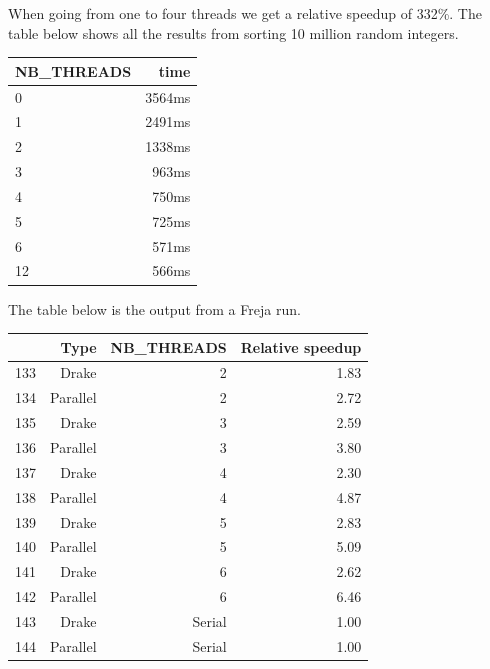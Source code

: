 \documentclass[a4paper,12pt]{article}
\begin{document}
\begin{minipage}{\textwidth}

  When going from one to four threads we get a relative speedup of 332\%. The table below shows all the results from sorting 10 million random integers.

  \begin{tabular}{ |l|r| }
	\hline
	NB\_THREADS & time \\
	\hline
    0 & 3564ms \\
    1 & 2491ms \\
    2 & 1338ms \\
    3 & 963ms \\
    4 & 750ms \\
    5 & 725ms \\
    6 & 571ms \\
    12 & 566ms \\
	\hline
  \end{tabular}

  \vspace{10mm}
  
  The table below is the output from a Freja run.

  \begin{tabular}{ |l|r|r|r| }
	  \hline
	   & Type & NB\_THREADS & Relative speedup \\
	  \hline
	  133 &        Drake  &       2    &    1.83 \\
	  134 &     Parallel  &       2    &    2.72 \\
	  135 &        Drake  &       3    &    2.59 \\
	  136 &     Parallel  &       3    &    3.80 \\
	  137 &        Drake  &       4    &    2.30 \\
	  138 &     Parallel  &       4    &    4.87 \\
	  139 &        Drake  &       5    &    2.83 \\
	  140 &     Parallel  &       5    &    5.09 \\
	  141 &        Drake  &       6    &    2.62 \\
	  142 &     Parallel  &       6    &    6.46 \\
	  143 &        Drake  &  Serial    &    1.00 \\
	  144 &     Parallel  &  Serial    &    1.00 \\
	  \hline
  \end{tabular}

\end{minipage}
\end{document}

